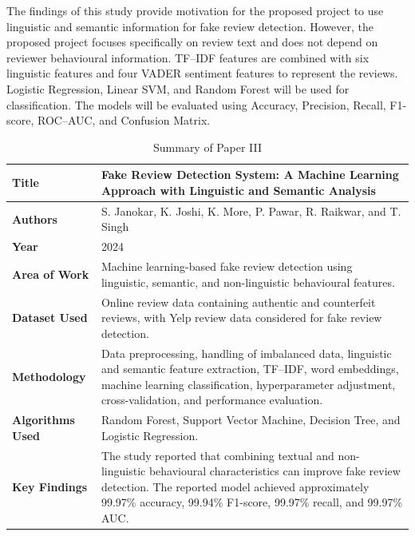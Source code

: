\documentclass[12pt,a4paper]{report}
\begin{document}
The findings of this study provide motivation for the proposed project to use linguistic and semantic information for fake review detection. However, the proposed project focuses specifically on review text and does not depend on reviewer behavioural information. TF--IDF features are combined with six linguistic features and four VADER sentiment features to represent the reviews. Logistic Regression, Linear SVM, and Random Forest will be used for classification. The models will be evaluated using Accuracy, Precision, Recall, F1-score, ROC--AUC, and Confusion Matrix.

\begin{table}[H]
\centering
\small
\renewcommand{\arraystretch}{1.4}

\begin{tabularx}{0.95\textwidth}{|p{}|X|}
\hline
\textbf{Title} &
Fake Review Detection System: A Machine Learning Approach with Linguistic and Semantic Analysis \\
\hline

\textbf{Authors} &
S. Janokar, K. Joshi, K. More, P. Pawar, R. Raikwar, and T. Singh \\
\hline

\textbf{Year} &
2024 \\
\hline

\textbf{Area of Work} &
Machine learning-based fake review detection using linguistic, semantic, and non-linguistic behavioural features. \\
\hline

\textbf{Dataset Used} &
Online review data containing authentic and counterfeit reviews, with Yelp review data considered for fake review detection. \\
\hline

\textbf{Methodology} &
Data preprocessing, handling of imbalanced data, linguistic and semantic feature extraction, TF--IDF, word embeddings, machine learning classification, hyperparameter adjustment, cross-validation, and performance evaluation. \\
\hline

\textbf{Algorithms Used} &
Random Forest, Support Vector Machine, Decision Tree, and Logistic Regression. \\
\hline

\textbf{Key Findings} &
The study reported that combining textual and non-linguistic behavioural characteristics can improve fake review detection. The reported model achieved approximately 99.97\% accuracy, 99.94\% F1-score, 99.97\% recall, and 99.97\% AUC. \\
\hline

\end{tabularx}

\caption{Summary of Paper III}
\label{tab:paper3}
\end{table}
\end{document}
